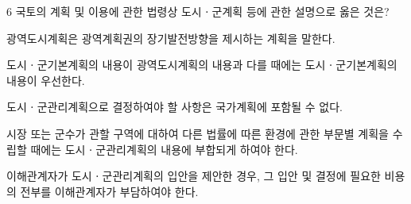\begin{question}{6}
국토의 계획 및 이용에 관한 법령상 도시ㆍ군계획 등에 관한 설명으로 옳은 것은?
\begin{choices}
  \item 광역도시계획은 광역계획권의 장기발전방향을 제시하는 계획을 말한다.
  \item 도시ㆍ군기본계획의 내용이 광역도시계획의 내용과 다를 때에는 도시ㆍ군기본계획의 내용이 우선한다.
  \item 도시ㆍ군관리계획으로 결정하여야 할 사항은 국가계획에 포함될 수 없다.
  \item 시장 또는 군수가 관할 구역에 대하여 다른 법률에 따른 환경에 관한 부문별 계획을 수립할 때에는 도시ㆍ군관리계획의 내용에 부합되게 하여야 한다.
  \item 이해관계자가 도시ㆍ군관리계획의 입안을 제안한 경우, 그 입안 및 결정에 필요한 비용의 전부를 이해관계자가 부담하여야 한다.
\end{choices}
\end{question}
